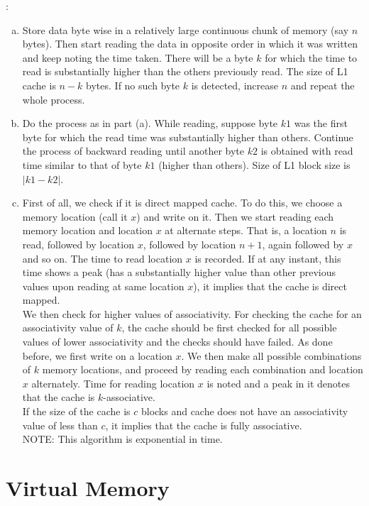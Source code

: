 \begin{ExerciseList}
\Answer:
\begin{enumerate}[(a) ]
\item
Store data byte wise in a relatively large continuous chunk of memory (say $n$ bytes). Then start reading the data in
opposite order in which it was written and keep noting the time taken. There will be a byte $k$ for which the time to
read is substantially higher than the others previously read. The size of L1 cache is $n-k$ bytes. If no such byte $k$
is detected, increase $n$ and repeat the whole process.  \item
Do the process as in part (a). While reading, suppose byte $k1$ was the first byte for which the read time was
substantially higher than others. Continue the process of backward reading until another byte $k2$ is obtained with read
time similar to that of byte $k1$ (higher than others). Size of L1 block size is $|k1-k2|$.  \item
First of all, we check if it is direct mapped cache. To do this, we choose a memory location (call it $x$) and write on
it. Then we start reading each memory location and location $x$ at alternate steps. That is, a location $n$ is read,
followed by location $x$, followed by location $n+1$, again followed by $x$ and so on. The time to read location $x$ is
recorded. If at any instant, this time shows a peak (has a substantially higher value than other previous values upon
reading at same location $x$), it implies that the cache is direct mapped.\\ We then check for higher values of
associativity. For checking the cache for an associativity value of $k$, the cache
should be first checked for all possible values of lower associativity and the checks should have failed. As done
before, we first write on a location $x$. We then make all possible combinations of $k$ memory locations, and proceed by
reading each combination and location $x$ alternately. Time for reading location $x$ is noted and a peak in it denotes
that the cache is $k$-associative.\\ If the size of the cache is $c$ blocks and cache does not have an associativity
value of less than $c$, it implies that the cache is fully associative.\\
NOTE: This algorithm is exponential in time.
\end{enumerate}

\end{ExerciseList}


\section*{Virtual Memory}

